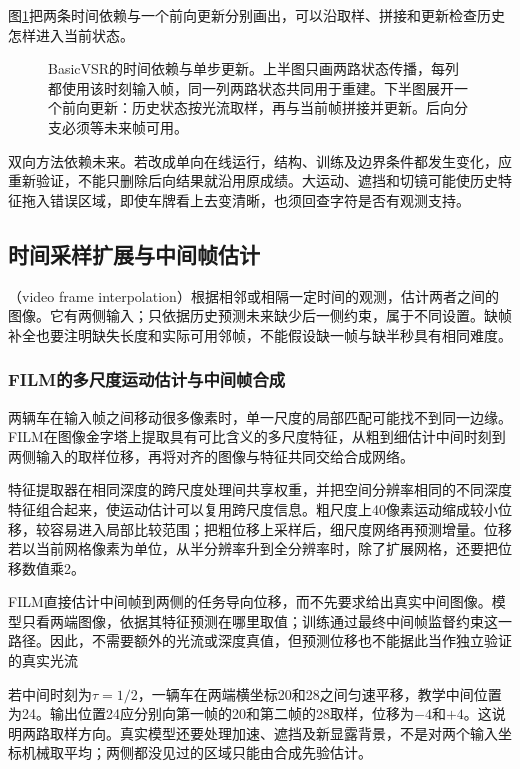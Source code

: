 图\ref{fig:vision-basicvsr-propagation}把两条时间依赖与一个前向更新分别画出，可以沿取样、拼接和更新检查历史怎样进入当前状态。
\begin{figure}[htbp]
  \centering
  
  \caption{BasicVSR的时间依赖与单步更新。上半图只画两路状态传播，每列都使用该时刻输入帧，同一列两路状态共同用于重建。下半图展开一个前向更新：历史状态按光流取样，再与当前帧拼接并更新。后向分支必须等未来帧可用。}
  \label{fig:vision-basicvsr-propagation}
\end{figure}
\FloatBarrier

双向方法依赖未来。若改成单向在线运行，结构、训练及边界条件都发生变化，应重新验证，不能只删除后向结果就沿用原成绩。大运动、遮挡和切镜可能使历史特征拖入错误区域，即使车牌看上去变清晰，也须回查字符是否有观测支持。

\subsection{时间采样扩展与中间帧估计}
\label{sec:vision-video-interpolation}

（video frame interpolation）根据相邻或相隔一定时间的观测，估计两者之间的图像。它有两侧输入；只依据历史预测未来缺少后一侧约束，属于不同设置。缺帧补全也要注明缺失长度和实际可用邻帧，不能假设缺一帧与缺半秒具有相同难度。

\subsubsection{FILM的多尺度运动估计与中间帧合成}
\label{sec:vision-video-film}

两辆车在输入帧之间移动很多像素时，单一尺度的局部匹配可能找不到同一边缘。FILM在图像金字塔上提取具有可比含义的多尺度特征，从粗到细估计中间时刻到两侧输入的取样位移，再将对齐的图像与特征共同交给合成网络。

特征提取器在相同深度的跨尺度处理间共享权重，并把空间分辨率相同的不同深度特征组合起来，使运动估计可以复用跨尺度信息。粗尺度上40像素运动缩成较小位移，较容易进入局部比较范围；把粗位移上采样后，细尺度网络再预测增量。位移若以当前网格像素为单位，从半分辨率升到全分辨率时，除了扩展网格，还要把位移数值乘2。

FILM直接估计中间帧到两侧的任务导向位移，而不先要求给出真实中间图像。模型只看两端图像，依据其特征预测在哪里取值；训练通过最终中间帧监督约束这一路径。因此，不需要额外的光流或深度真值，但预测位移也不能据此当作独立验证的真实光流

若中间时刻为$\tau=1/2$，一辆车在两端横坐标20和28之间匀速平移，教学中间位置为24。输出位置24应分别向第一帧的20和第二帧的28取样，位移为$-4$和$+4$。这说明两路取样方向。真实模型还要处理加速、遮挡及新显露背景，不是对两个输入坐标机械取平均；两侧都没见过的区域只能由合成先验估计。

